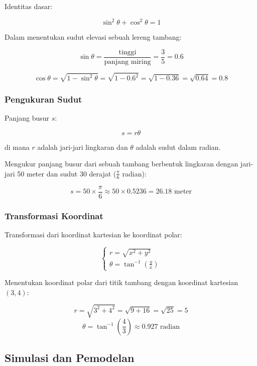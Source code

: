 \documentclass[
]{book}
\begin{document}
Identitas dasar:

\[
\sin^2 \theta + \cos^2 \theta = 1
\]

Dalam menentukan sudut elevasi sebuah lereng tambang:

\[
  \sin \theta = \frac{\text{tinggi}}{\text{panjang miring}} = \frac{3}{5} = 0.6
\]

\[
\cos \theta = \sqrt{1 - \sin^2 \theta} = \sqrt{1 - 0.6^2} = \sqrt{1 - 0.36} = \sqrt{0.64} = 0.8
\]

\subsubsection*{Pengukuran Sudut}\label{pengukuran-sudut}

Panjang busur \(s\):

\[
s = r \theta
\]

di mana \(r\) adalah jari-jari lingkaran dan \(\theta\) adalah sudut dalam radian.

Mengukur panjang busur dari sebuah tambang berbentuk lingkaran dengan jari-jari 50 meter dan sudut 30 derajat (\(\frac{\pi}{6}\) radian):

\[
s = 50 \times \frac{\pi}{6} \approx 50 \times 0.5236 = 26.18 \text{ meter}
\]

\subsubsection*{Transformasi Koordinat}\label{transformasi-koordinat}

Transformasi dari koordinat kartesian ke koordinat polar:

\[
\begin{cases}
r = \sqrt{x^2 + y^2} \\
\theta = \tan^{-1} \left( \frac{y}{x} \right)
\end{cases}
\]

Menentukan koordinat polar dari titik tambang dengan koordinat kartesian \((3, 4)\):

\[
r = \sqrt{3^2 + 4^2} = \sqrt{9 + 16} = \sqrt{25} = 5
\]
\[
\theta = \tan^{-1} \left( \frac{4}{3} \right) \approx 0.927 \text{ radian}
\]

\subsection{Simulasi dan Pemodelan}\label{simulasi-dan-pemodelan}
\end{document}
